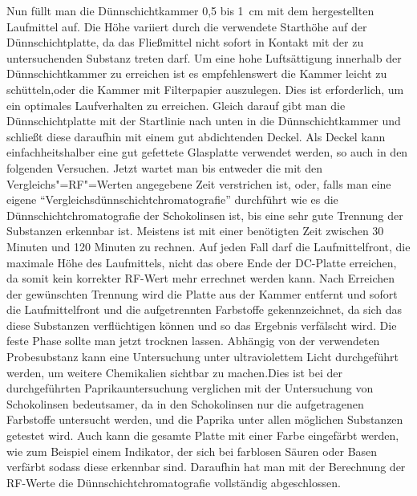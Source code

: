 \documentclass[11pt]{scrreprt}
\begin{document}
 Nun füllt man die Dünnschichtkammer 0,5 bis \SI{1}{\centi\meter} mit dem hergestellten Laufmittel auf. Die Höhe variiert durch die verwendete Starthöhe auf der Dünnschichtplatte, da das Fließmittel nicht sofort in Kontakt mit der zu untersuchenden Substanz treten darf. Um eine hohe Luftsättigung innerhalb der Dünnschichtkammer zu erreichen ist es empfehlenswert die Kammer leicht zu schütteln,oder die Kammer mit Filterpapier auszulegen. Dies ist erforderlich, um ein optimales Laufverhalten zu erreichen. Gleich darauf gibt man die Dünnschichtplatte mit der Startlinie nach unten in die Dünnschichtkammer und schließt diese daraufhin mit einem gut abdichtenden Deckel. Als Deckel kann einfachheitshalber eine gut gefettete Glasplatte verwendet werden, so auch in den folgenden Versuchen. Jetzt wartet man bis entweder die mit den Vergleichs"=RF"=Werten angegebene Zeit verstrichen ist, oder, falls man eine eigene \enquote{Vergleichsdünnschichtchromatografie} durchführt wie es die Dünnschichtchromatografie der Schokolinsen ist, bis eine sehr gute Trennung der Substanzen erkennbar ist. Meistens ist mit einer benötigten Zeit zwischen 30 Minuten und 120 Minuten zu rechnen. Auf jeden Fall darf die Laufmittelfront, die maximale Höhe des Laufmittels, nicht das obere Ende der DC-Platte erreichen, da somit kein korrekter RF-Wert mehr errechnet werden kann. Nach Erreichen der gewünschten Trennung wird die Platte aus der Kammer entfernt und sofort die Laufmittelfront und die aufgetrennten Farbstoffe gekennzeichnet, da sich das diese Substanzen verflüchtigen können und so das Ergebnis verfälscht wird. 
 Die feste Phase sollte man jetzt trocknen lassen. Abhängig von der verwendeten Probesubstanz kann eine Untersuchung unter ultraviolettem Licht durchgeführt werden, um weitere Chemikalien sichtbar zu machen.Dies ist bei der durchgeführten Paprikauntersuchung verglichen mit der Untersuchung von Schokolinsen bedeutsamer, da in den Schokolinsen nur die aufgetragenen Farbstoffe untersucht werden, und die Paprika unter allen möglichen Substanzen getestet wird. Auch kann die gesamte Platte mit einer Farbe eingefärbt werden, wie zum Beispiel einem Indikator, der sich bei farblosen Säuren oder Basen verfärbt sodass diese  erkennbar sind. Daraufhin hat man mit der Berechnung der RF-Werte die Dünnschichtchromatografie vollständig abgeschlossen\parencite[S.117-118]{Wittke,1984}.
\end{document}
